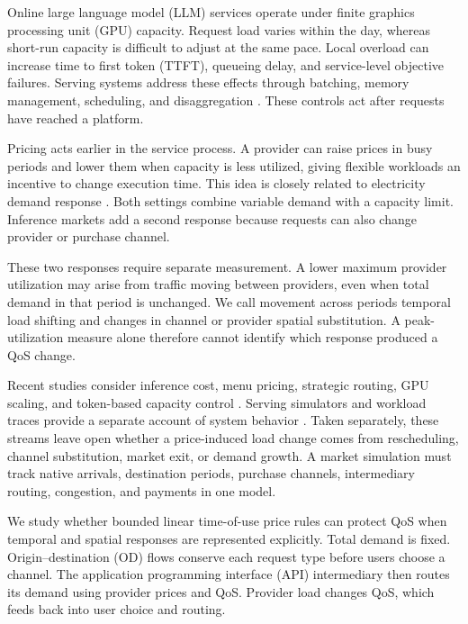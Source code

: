 \documentclass[11pt,a4paper]{article}
\begin{document}
Online large language model (LLM) services operate under finite graphics processing unit (GPU) capacity. Request load varies within the day, whereas short-run capacity is difficult to adjust at the same pace. Local overload can increase time to first token (TTFT), queueing delay, and service-level objective failures. Serving systems address these effects through batching, memory management, scheduling, and disaggregation \cite{yu2022orca,kwon2023pagedattention,agrawal2024sarathiserve,patel2024splitwise,zhong2024distserve}. These controls act after requests have reached a platform.

Pricing acts earlier in the service process. A provider can raise prices in busy periods and lower them when capacity is less utilized, giving flexible workloads an incentive to change execution time. This idea is closely related to electricity demand response \cite{schweppe1988spot,borenstein2005long,albadi2008summary,faruqui2010household,siano2014demand}. Both settings combine variable demand with a capacity limit. Inference markets add a second response because requests can also change provider or purchase channel.

These two responses require separate measurement. A lower maximum provider utilization may arise from traffic moving between providers, even when total demand in that period is unchanged. We call movement across periods temporal load shifting and changes in channel or provider spatial substitution. A peak-utilization measure alone therefore cannot identify which response produced a QoS change.

Recent studies consider inference cost, menu pricing, strategic routing, GPU scaling, and token-based capacity control \cite{demirer2025emerging,bergemann2025menu,guo2026prillm,yan2026stackelberg,cunningham2026token}. Serving simulators and workload traces provide a separate account of system behavior \cite{agrawal2024vidur,wang2025burstgpt}. Taken separately, these streams leave open whether a price-induced load change comes from rescheduling, channel substitution, market exit, or demand growth. A market simulation must track native arrivals, destination periods, purchase channels, intermediary routing, congestion, and payments in one model.

We study whether bounded linear time-of-use price rules can protect QoS when temporal and spatial responses are represented explicitly. Total demand is fixed. Origin--destination (OD) flows conserve each request type before users choose a channel. The application programming interface (API) intermediary then routes its demand using provider prices and QoS. Provider load changes QoS, which feeds back into user choice and routing.
\end{document}
